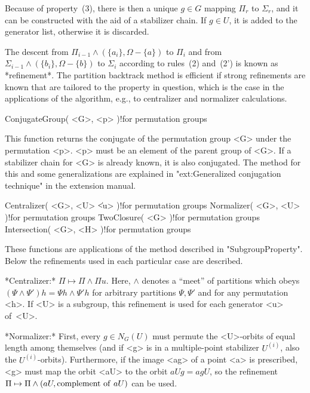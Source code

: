 Because of property~(3), there is then a  unique $g\in G$ mapping $\Pi_r$
to $\Sigma_r$,  and it can be constructed   with the aid of  a stabilizer
chain.  If $g\in U$, it  is added to the  generator list, otherwise it is
discarded.

The descent from  $\Pi_{i-1}\wedge (\{a_i\},\Omega-\{a\})$ to $\Pi_i$ and
from $\Sigma_{i-1}\wedge (\{b_i\}, \Omega-\{b\})$ to $\Sigma_i$ according
to rules~(2)  and~(2') is known as  *refinement*. The partition backtrack
method is efficient if strong refinements are known  that are tailored to
the property  in question, which is  the case in  the applications of the
algorithm, e.g., to centralizer and normalizer calculations.


\>ConjugateGroup( <G>, <p> )!{for permutation groups}

This  function returns the  conjugate of the  permutation group <G> under
the permutation <p>. <p> must be  an element of  the parent group of <G>.
If a stabilizer  chain for <G> is already  known, it is also  conjugated.
The   method    for this  and  some    generalizations   are explained in
"ext:Generalized conjugation technique" in the extension manual.

\>Centralizer( <G>, <U> \| <u> )!{for permutation groups}
\>Normalizer( <G>, <U> )!{for permutation groups}
\>TwoClosure( <G> )!{for permutation groups}
\>Intersection( <G>, <H> )!{for permutation groups}

These functions    are    applications  of  the   method   described   in
"SubgroupProperty". Below the refinements  used  in each particular  case
are described.

\medskip
*Centralizer:* $\Pi \mapsto \Pi  \wedge \Pi u$.  Here, $\wedge$ denotes a
``meet'' of partitions which obeys $(\Psi \wedge  \Psi')h = \Psi h \wedge
\Psi'h$   for arbitrary partitions $\Psi,\Psi'$   and for any permutation
<h>. If <U> is a subgroup, this refinement is used for each generator <u>
of~<U>.

\medskip
*Normalizer:*  First, every $g\in N_G(U)$ must  permute the <U>-orbits of
equal  length among   themselves  (and if  <g>   is  in a  multiple-point
stabilizer $U^{(i)}$,  also the   $U^{(i)}$-orbits). Furthermore, if  the
image <ag> of a  point <a> is prescribed, <g>  must map the orbit <aU> to
the orbit $aUg  = agU$, so  the refinement $\Pi  \mapsto \Pi  \wedge (aU,
{\rm complement}\allowbreak\ {\rm of\ }aU)$ can be used.

